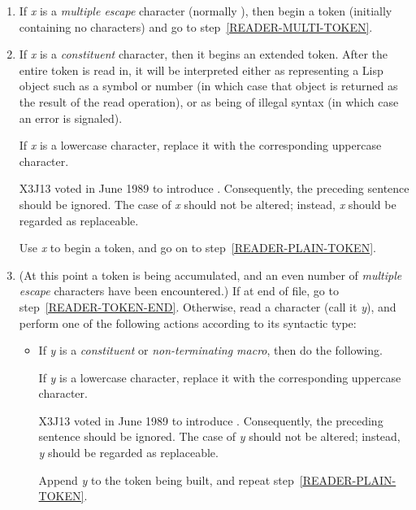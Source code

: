 \begin{enumerate}
\item
If {\it x} is a {\it multiple escape} character (normally \cd{|}),
then begin a token (initially
containing no characters) and go to step~\ref{READER-MULTI-TOKEN}.

\item
If {\it x} is a {\it constituent} character, then it begins an extended token.
\label{READER-CONSTITUENT}\relax
After the entire token is read in, it will be interpreted
either as representing a Lisp object such as a symbol or number
(in which case that object is returned as the result of the read operation),
or as being of illegal syntax (in which case an error is signaled).
\begin{obsolete}
If {\it x} is a lowercase character, replace it with the
corresponding uppercase character.
\end{obsolete}
\begin{newer}
X3J13 voted in June 1989  to introduce
.  Consequently, the preceding sentence
should be ignored.  The case of {\it x\/} should not be altered; instead,
{\it x} should be regarded as replaceable.
\end{newer}
Use {\it x} to begin a token, and go on to step~\ref{READER-PLAIN-TOKEN}.

\item
(At this point a token is being accumulated, and an even number
of {\it multiple escape} characters have been encountered.)
If at end of file, go to step~\ref{READER-TOKEN-END}.
Otherwise, read a character (call it {\it y}), and
perform one of the following actions according to its syntactic type:
\label{READER-PLAIN-TOKEN}
\begin{itemize}
\item
If {\it y} is a {\it constituent} or {\it non-terminating macro},
then do the following.
\begin{obsolete}
If {\it y} is a lowercase character, replace it with the
corresponding uppercase character.
\end{obsolete}
\begin{newer}
X3J13 voted in June 1989  to introduce
.  Consequently, the preceding sentence
should be ignored.  The case of {\it y\/} should not be altered; instead,
{\it y} should be regarded as replaceable.
\end{newer}
Append {\it y} to the token being built,
and repeat step~\ref{READER-PLAIN-TOKEN}.


\end{itemize}
\end{enumerate}
